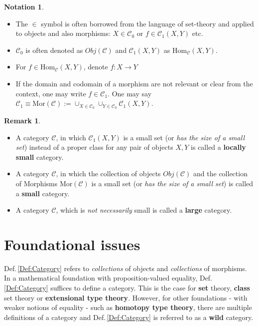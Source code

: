 \documentclass{article}
\theoremstyle{definition}
\newtheorem{remark}[definition]{Remark}
\newtheorem{notation}[definition]{Notation}
\begin{document}
\begin{notation}\leavevmode
    \label{Not:ObjMorInCat}
    \begin{itemize}
        \item The $\in$ symbol is often borrowed from the language of set-theory and applied to objects and also morphisms: $X \in \mathcal{C}_0$ or $f \in \mathcal{C}_1(X,Y)$ etc.
        \item  $\mathcal{C}_0$ is often denoted as $Obj(\mathcal{C})$ and $\mathcal{C}_1(X,Y)$ as $\text{Hom}_{\mathcal{C}}(X,Y)$.
        \item For $f \in \text{Hom}_{\mathcal{C}}(X,Y)$, denote $f:X\rightarrow Y$
        \item If the domain and codomain of a morphism are not relevant or clear from the context, one may write $f \in \mathcal{C}_1$. One may say $\mathcal{C}_1 \equiv \text{Mor}(\mathcal{C}) := {\cup}_{X \in \mathcal{C}_0} {\cup}_{Y \in \mathcal{C}_0} \mathcal{C}_1(X,Y)$.
    \end{itemize}
\end{notation}

\begin{remark}\leavevmode
    \label{Rem:LargeVSmallCat}
    \begin{itemize}
        \item A category $\mathcal{C}$, in which $\mathcal{C}_1(X,Y)$ is a small set (or \textit{has the size of a small set}) instead of a proper class for any pair of objects $X,Y$ is called a \textbf{locally small} category.
        \item A category $\mathcal{C}$, in which the collection of objects $Obj(\mathcal{C})$ and the collection of Morphisms $\text{Mor}(\mathcal{C})$ is a small set (or \textit{has the size of a small set}) is called a \textbf{small} category.
        \item A category $\mathcal{C}$, which is \textit{not necessarily} small is called a \textbf{large} category.
    \end{itemize}
\end{remark}

\section{Foundational issues}
Def.\,\ref{Def:Category} refers to \textit{collections} of objects and \textit{collections} of morphisms. In a mathematical foundation with proposition-valued equality, Def.\,\ref{Def:Category} suffices to define a category. This is the case for \textbf{set} theory, \textbf{class} set theory or \textbf{extensional type theory}. However, for other foundations - with weaker notions of equality - such as \textbf{homotopy type theory}, there are multiple definitions of a category and Def.\,\ref{Def:Category} is referred to as a \textbf{wild} category.
\end{document}
